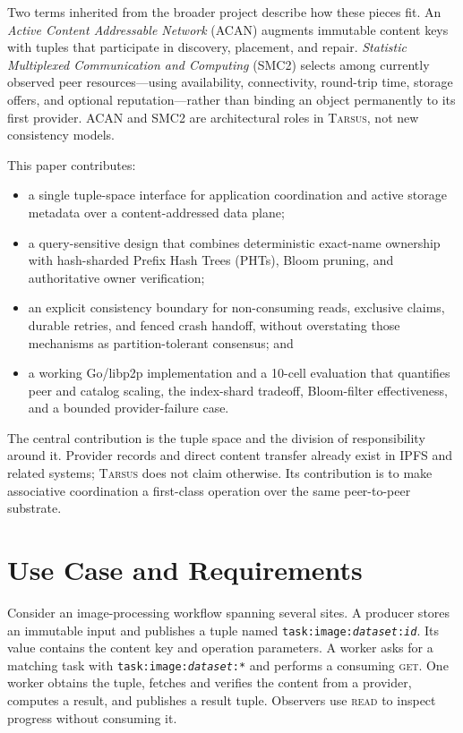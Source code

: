 \documentclass[conference]{IEEEtran}
\newcommand{\system}{\textsc{Tarsus}\xspace}
\newcommand{\readop}{\textsc{read}\xspace}
\newcommand{\getop}{\textsc{get}\xspace}
\begin{document}
Two terms inherited from the broader project describe how these pieces fit.
An \emph{Active Content Addressable Network} (ACAN) augments immutable content
keys with tuples that participate in discovery, placement, and repair.
\emph{Statistic Multiplexed Communication and Computing} (SMC2) selects among
currently observed peer resources---using availability, connectivity,
round-trip time, storage offers, and optional reputation---rather than binding
an object permanently to its first provider. ACAN and SMC2 are architectural
roles in \system, not new consistency models.

This paper contributes:

\begin{itemize}
  \item a single tuple-space interface for application coordination and active
  storage metadata over a content-addressed data plane;
  \item a query-sensitive design that combines deterministic exact-name
  ownership with hash-sharded Prefix Hash Trees (PHTs), Bloom pruning, and
  authoritative owner verification;
  \item an explicit consistency boundary for non-consuming reads, exclusive
  claims, durable retries, and fenced crash handoff, without overstating those
  mechanisms as partition-tolerant consensus; and
  \item a working Go/libp2p implementation and a 10-cell evaluation that
  quantifies peer and catalog scaling, the index-shard tradeoff, Bloom-filter
  effectiveness, and a bounded provider-failure case.
\end{itemize}

The central contribution is the tuple space and the division of responsibility
around it. Provider records and direct content transfer already exist in IPFS
and related systems; \system does not claim otherwise. Its contribution is to
make associative coordination a first-class operation over the same
peer-to-peer substrate.

\section{Use Case and Requirements}
\label{sec:requirements}

Consider an image-processing workflow spanning several sites. A producer
stores an immutable input and publishes a tuple named
\texttt{task:image:\emph{dataset}:\emph{id}}. Its value contains the content
key and operation parameters. A worker asks for a matching task with
\texttt{task:image:\emph{dataset}:*} and performs a consuming \getop. One
worker obtains the tuple, fetches and verifies the content from a provider,
computes a result, and publishes a result tuple. Observers use \readop to
inspect progress without consuming it.
\end{document}
